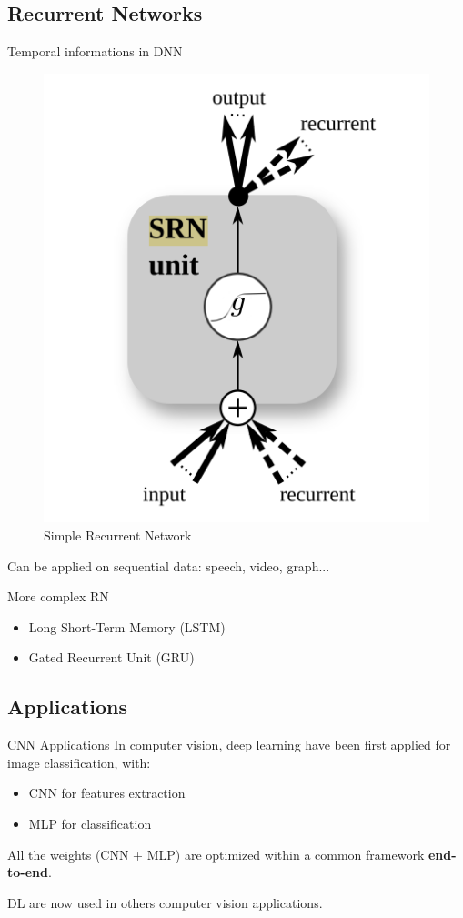 \subsection{Recurrent Networks}
\begin{frame}{Temporal informations in DNN}
	\begin{figure}
		\includegraphics[width=0.2\linewidth]{images/srn.png}
		\caption{Simple Recurrent Network}
	\end{figure}

	Can be applied on sequential data: speech, video, graph...
	
	\begin{block}{More complex RN}
		\begin{itemize}
			\item Long Short-Term Memory (LSTM)
			\item Gated Recurrent Unit (GRU)
		\end{itemize}	
	\end{block}
\end{frame}

\subsection{Applications}
\begin{frame}{CNN Applications}
	In computer vision, deep learning have been first applied for image classification, with:
	\begin{itemize}
		\item CNN for features extraction
		\item MLP for classification
	\end{itemize}
	All the weights (CNN + MLP) are optimized within a common framework \textbf{end-to-end}.

	\hfill
	
	DL are now used in others computer vision applications.
\end{frame}

